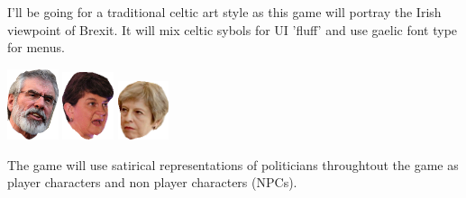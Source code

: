\documentclass[a4paper]{scrreprt}
\begin{document}
    \begin{flushleft}
        I'll be going for a traditional celtic art style as this game will portray the Irish viewpoint of Brexit. 
        It will mix celtic sybols for UI 'fluff' and use gaelic font type for menus.
    \end{flushleft}
    \begin{addmargin}[13.5em]{0em}
        \includegraphics[width=1.5cm]{gerry-right}
        \includegraphics[width=1.5cm]{arlene}
        \includegraphics[width=1.5cm]{tess}
    \end{addmargin}
    \begin{flushleft}
    The game will use satirical representations of politicians throughtout the game as player characters and non player characters (NPCs).
    \end{flushleft}
\end{document}
